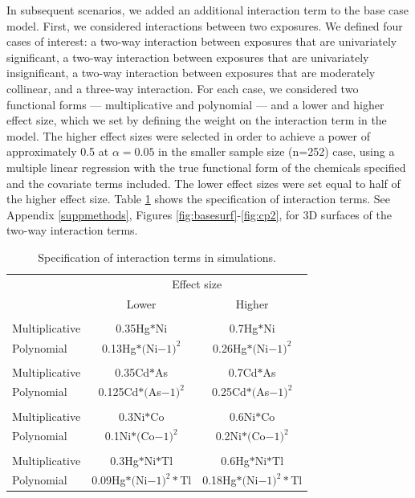 \documentclass[12pt, twoside]{amherstthesis}
\begin{document}
In subsequent scenarios, we added an additional interaction term to the base case model. First, we considered interactions between two exposures. We defined four cases of interest: a two-way interaction between exposures that are univariately significant, a two-way interaction between exposures that are univariately insignificant, a two-way interaction between exposures that are moderately collinear, and a three-way interaction. For each case, we considered two functional forms --- multiplicative and polynomial --- and a lower and higher effect size, which we set by defining the weight on the interaction term in the model. The higher effect sizes were selected in order to achieve a power of approximately 0.5 at \(\alpha=0.05\) in the smaller sample size (n=252) case, using a multiple linear regression with the true functional form of the chemicals specified and the covariate terms included. The lower effect sizes were set equal to half of the higher effect size. Table \ref{tab:scenarios} shows the specification of interaction terms. See Appendix \ref{suppmethods}, Figures \ref{fig:basesurf}-\ref{fig:cp2}, for 3D surfaces of the two-way interaction terms.
\begin{table}

\caption{\label{tab:scenarios}Specification of interaction terms in simulations.}
\centering
\begin{tabular}[t]{>{\raggedright\arraybackslash}p{10em}cc}
\toprule
\multicolumn{1}{c}{ } & \multicolumn{2}{c}{Effect size} \\
\cmidrule(l{3pt}r{3pt}){2-3}
 & Lower & Higher\\
\midrule
\addlinespace[0.3em]
\multicolumn{3}{l}{\textbf{Univariately significant}}\\
\hspace{1em}Multiplicative & 0.35Hg$*$Ni & 0.7Hg$*$Ni\\
\hspace{1em}Polynomial & 0.13Hg$*($Ni$-1)^2$ & 0.26Hg$*($Ni$-1)^2$\\
\addlinespace[0.3em]
\multicolumn{3}{l}{\textbf{Univariately insignificant}}\\
\hspace{1em}Multiplicative & 0.35Cd$*$As & 0.7Cd$*$As\\
\hspace{1em}Polynomial & 0.125Cd$*($As$-1)^2$ & 0.25Cd$*($As$-1)^2$\\
\addlinespace[0.3em]
\multicolumn{3}{l}{\textbf{Highly correlated}}\\
\hspace{1em}Multiplicative & 0.3Ni$*$Co & 0.6Ni$*$Co\\
\hspace{1em}Polynomial & 0.1Ni$*($Co$-1)^2$ & 0.2Ni$*($Co$-1)^2$\\
\addlinespace[0.3em]
\multicolumn{3}{l}{\textbf{Three-way interaction}}\\
\hspace{1em}Multiplicative & 0.3Hg$*$Ni$*$Tl & 0.6Hg$*$Ni$*$Tl\\
\hspace{1em}Polynomial & 0.09Hg$*($Ni$-1)^2*$Tl & 0.18Hg$*($Ni$-1)^2*$Tl\\
\bottomrule
\end{tabular}
\end{table}
\end{document}
